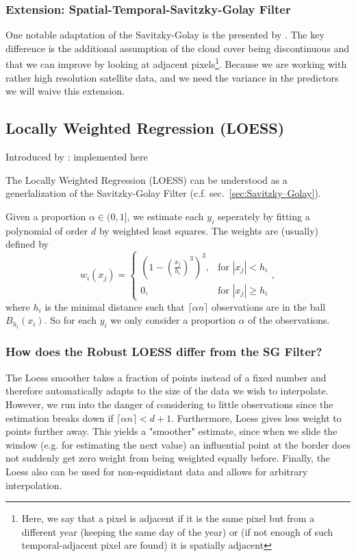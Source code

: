 \subsubsection*{Extension: Spatial-Temporal-Savitzky-Golay Filter}
One notable adaptation of the Savitzky-Golay is the presented by \cite{caoSimpleMethodImprove2018b}. The key difference is the additional assumption of the cloud cover being discontinuous and that we can improve by looking at adjacent pixels\footnote{Here, we say that a pixel is adjacent if it is the same pixel but from a different year (keeping the same day of the year) or (if not enough of such temporal-adjacent pixel are found) it is spatially adjacent}. Because we are working with rather high resolution satellite data, and we need the variance in the predictors we will waive this extension.


\subsection{Locally Weighted Regression (LOESS)}
\label{sec:loess}
Introduced by : \cite{clevelandRobustLocallyWeighted1979}
implemented here \cite{cappellariATLAS3DProjectXX2013}

The Locally Weighted Regression (LOESS) can be understood as a generlalization of the Savitzky-Golay Filter (c.f. sec.~\ref{sec:Savitzky–Golay}).

Given a proportion $\alpha \in (0,1]$, we estimate each $y_i$ seperately by fitting a polynomial of order $d$ by weighted least squares. The weights are (usually) defined by
$$w_i(x_j)=\begin{cases}
    \left(1-\left(\frac{x_j}{h_i}\right)^{3}\right)^{3}, & \text{for } |x_j|<h_i           \\
    0,                                                   & \text{for } |x_j| \geqslant h_i
  \end{cases} ,$$
where $h_i$ is the minimal distance such that $\lceil \alpha n\rceil$ observations are in the ball $B_{h_i}(x_i)$. So for each $y_i$ we only consider a proportion $\alpha$ of the observations.

\subsubsection{How does the Robust LOESS differ from the SG Filter?}
The Loess smoother takes a fraction of points instead of a fixed number and therefore automatically adapts to the size of the data we wish to interpolate. However, we run into the danger of considering to little observations since the estimation breaks down if $\lceil \alpha n\rceil < d+1$.
Furthermore, Loess gives less weight to points further away. This yields a "smoother" estimate, since when we slide the window (e.g. for estimating the next value) an influential point at the border does not suddenly get zero weight from being weighted equally before.
Finally, the Loess also can be used for non-equidistant data and allows for arbitrary interpolation.

